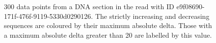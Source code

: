 \begin{figure}
\centering

	\caption[300 data points from a DNA section in the read with ID e9f08690-171f-476f-9119-5330d0290126.]{\label{fig:epsilon}300 data points from a DNA section in the read with ID e9f08690-171f-476f-9119-5330d0290126. The strictly increasing and decreasing sequences are coloured by their maximum absolute delta. Those with a maximum absolute delta greater than 20 are labelled by this value.}
\end{figure}
